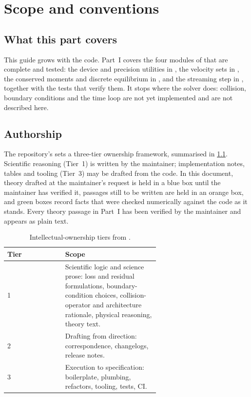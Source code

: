 
\chapter{Scope and conventions}

\label{Chapter1}


\section{What this part covers}

This guide grows with the code. Part~I covers the four modules of  that
are complete and tested: the device and precision utilities in , the velocity
sets in , the conserved moments and discrete equilibrium in
, and the streaming step in , together with the
tests that verify them. It stops where the solver does: collision, boundary conditions and
the time loop are not yet implemented and are not described here.

\section{Authorship}

The repository's  sets a three-tier ownership framework, summarised in
\cref{tab:tiers}. Scientific reasoning (Tier~1) is written by the maintainer; implementation
notes, tables and tooling (Tier~3) may be drafted from the code. In this document, theory
drafted at the maintainer's request is held in a blue box until the maintainer has verified
it, passages still to be written are held in an orange box, and green boxes record facts
that were checked numerically against the code as it stands. Every theory passage in Part~I
has been verified by the maintainer and appears as plain text.

\begin{table}[h]
\centering\small
\begin{tabular}{@{}lp{0.62\linewidth}@{}}
\toprule
Tier & Scope \\
\midrule
1 & Scientific logic and science prose: loss and residual formulations, boundary-condition
    choices, collision-operator and architecture rationale, physical reasoning, theory text. \\
2 & Drafting from direction: correspondence, changelogs, release notes. \\
3 & Execution to specification: boilerplate, plumbing, refactors, tooling, tests, CI. \\
\bottomrule
\end{tabular}
\caption{Intellectual-ownership tiers from .}
\label{tab:tiers}
\end{table}

